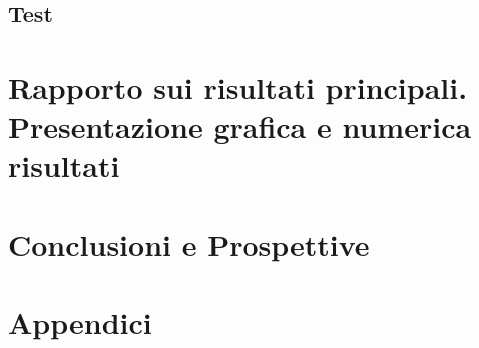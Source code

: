 \documentclass{article}
\begin{document}
\subsection{Test}

\section{Rapporto sui risultati principali. Presentazione grafica e numerica risultati}

\section{ Conclusioni e Prospettive}


\section{Appendici}
\end{document}
